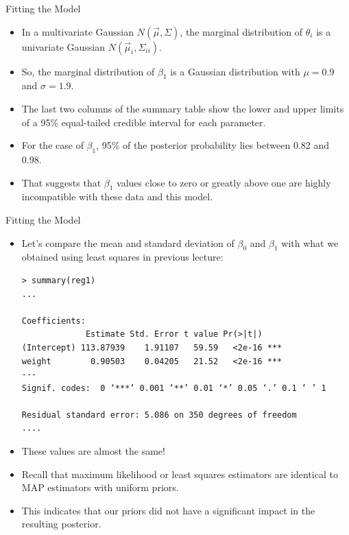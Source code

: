 \documentclass[handout]{beamer}
\begin{document}
\begin{frame}[fragile]{Fitting the Model}
\scriptsize{
\begin{itemize}
 
  \item In a multivariate Gaussian $N(\vec{\mu},\Sigma)$, the marginal distribution of $\theta_i$ is a univariate Gaussian $N(\vec{\mu}_i,\Sigma_{ii})$. 

  \item So, the marginal distribution of $\beta_1$ is a Gaussian distribution with $\mu=0.9$ and $\sigma=1.9$. 
  
  \item The last two columns of the summary table show the lower and upper limits of a 95\% equal-tailed credible interval for each parameter.
  
  \item For the case of $\beta_1$, 95\% of the posterior probability lies between 0.82 and 0.98. 
  
  \item That suggests that $\beta_1$ values close to zero or greatly above one are highly incompatible with these data and this model.
 
\end{itemize}
 

 
}
\end{frame}


\begin{frame}[fragile]{Fitting the Model}
\scriptsize{
\begin{itemize}

\item Let's compare the mean and standard deviation of $\beta_0$ and $\beta_1$ with what we obtained using least squares in previous lecture:

\begin{verbatim}
> summary(reg1)
...

Coefficients:
             Estimate Std. Error t value Pr(>|t|)    
(Intercept) 113.87939    1.91107   59.59   <2e-16 ***
weight        0.90503    0.04205   21.52   <2e-16 ***
---
Signif. codes:  0 ‘***’ 0.001 ‘**’ 0.01 ‘*’ 0.05 ‘.’ 0.1 ‘ ’ 1

Residual standard error: 5.086 on 350 degrees of freedom
....
\end{verbatim}


\item These values are almost the same!

\item Recall that maximum likelihood or least squares estimators are identical to MAP estimators with uniform priors.

\item This indicates that our priors did not have a significant impact in the resulting posterior.



 
\end{itemize}
 

 
}
\end{frame}
\end{document}
